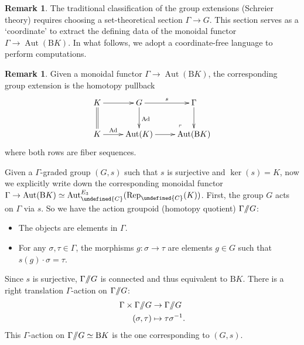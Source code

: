 \documentclass[10pt]{article}
\let\mathbb\undefined
\theoremstyle{definition}
\newtheorem{rem}[thm]{Remark}
\numberwithin{equation}{section}
\numberwithin{thm}{section}
\newcommand{\bit}{\begin{itemize}}
\newcommand{\eit}{\end{itemize}}
\newcommand{\Cb}{\mathbb{C}}
\newcommand{\rmB}{\mathrm{B}}
\DeclareMathOperator{\Aut}{Aut}
\newcommand{\rep}{\mathrm{Rep}}
\newcommand{\dquotient}{/\mkern-6mu/}
\begin{document}
\begin{rem}
The traditional classification of the group extensions (Schreier theory) requires choosing a set-theoretical section $\Gamma \to G$. This section serves as a `coordinate' to extract the defining data of the monoidal functor $\Gamma \to \Aut(\rmB K)$. In what follows, we adopt a coordinate-free language to perform computations.
\end{rem}

\begin{rem}
Given a monoidal functor $\Gamma \to \Aut(\rmB K)$, the corresponding group extension is the homotopy pullback
\[
\xymatrix{
K \ar[r] \ar@{=}[d] & G \ar[r]^-{s} \ar[d]^{\mathrm{Ad}} \ar@{}[dr]|>>{\ulcorner} & \Gamma \ar[d] \\
K \ar[r]^-{\mathrm{Ad}} & \Aut(K) \ar[r] & \Aut(\rmB K)
}
\]
where both rows are fiber sequences.
\end{rem}

Given a $\Gamma$-graded group $(G,s)$ such that $s$ is surjective and $\ker(s) = K$, now we explicitly write down the corresponding monoidal functor $\Gamma \to \Aut(\rmB K) \simeq \Aut_\Cb^{E_3}(\rep_\Cb(K))$. First, the group $G$ acts on $\Gamma$ via $s$. So we have the action groupoid (homotopy quotient) $\Gamma \dquotient G$:
\bit
\item The objects are elements in $\Gamma$.
\item For any $\sigma,\tau \in \Gamma$, the morphisms $g \colon \sigma \to \tau$ are elements $g \in G$ such that $s(g) \cdot \sigma = \tau$.
\eit
Since $s$ is surjective, $\Gamma \dquotient G$ is connected and thus equivalent to $\rmB K$. There is a right translation $\Gamma$-action on $\Gamma \dquotient G$:
\begin{align*}
\Gamma \times \Gamma \dquotient G & \to \Gamma \dquotient G \\
(\sigma,\tau) & \mapsto \tau \sigma^{-1} .
\end{align*}
This $\Gamma$-action on $\Gamma \dquotient G \simeq \rmB K$ is the one corresponding to $(G,s)$.
\end{document}
